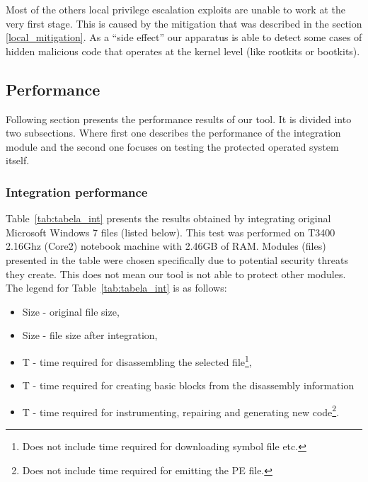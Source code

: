 \documentclass[10pt,twocolumn,a4paper]{article}
\begin{document}
Most of the others local privilege escalation exploits are unable to work at the very first stage. This is caused by the mitigation that was described in the section \ref{local_mitigation}. \newline
{\newline\noindent}As a ``side effect'' our apparatus is able to detect some cases of hidden malicious code that operates at the kernel level (like rootkits or bootkits).

\subsection{Performance}

Following section presents the performance results of our tool. It is divided into two subsections. Where first one describes the performance of the integration module and the second one focuses on testing the protected operated system itself.

\subsubsection{Integration performance}\label{sec:int_performance}

Table~\ref{tab:tabela_int} presents the results obtained by integrating original Microsoft Windows 7 files (listed below). This test was performed on T3400 2.16Ghz (Core2) notebook machine with 2.46GB of RAM. Modules (files) presented in the table were chosen specifically due to potential security threats they create. This does not mean our tool is not able to protect other modules.\newline
{\newline}The legend for Table~\ref{tab:tabela_int} is as follows:
\begin{itemize}
    \item Size - original file size,
    \item Size - file size after integration,
    \item T - time required for disassembling the selected file\footnote{Does not include time required for downloading symbol file etc.},
    \item T - time required for creating basic blocks from the disassembly information
    \item T - time required for instrumenting, repairing and generating new code\footnote{Does not include time required for emitting the PE file.}.
\end{itemize}
\end{document}
